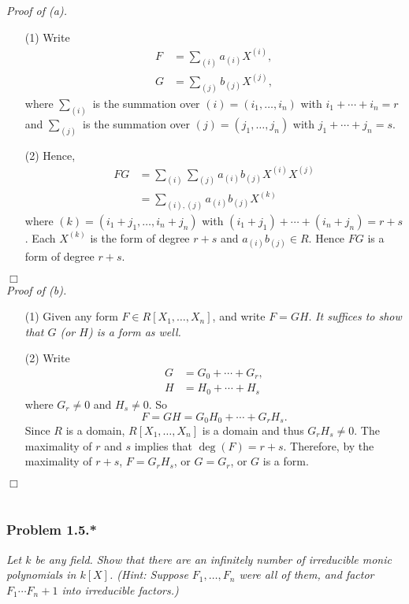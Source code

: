 \documentclass{article}
\begin{document}
\emph{Proof of (a).}
\begin{enumerate}
\item[(1)]
  Write
  \begin{align*}
    F &= \sum_{(i)} a_{(i)} X^{(i)}, \\
    G &= \sum_{(j)} b_{(j)} X^{(j)},
  \end{align*}
  where $\sum_{(i)}$ is the summation over $(i) = (i_1,\ldots,i_n)$ with $i_1+\cdots+i_n = r$
  and $\sum_{(j)}$ is the summation over $(j) = (j_1,\ldots,j_n)$ with $j_1+\cdots+j_n = s$.

\item[(2)]
  Hence,
  \begin{align*}
    FG
    &= \sum_{(i)} \sum_{(j)} a_{(i)}b_{(j)} X^{(i)}X^{(j)} \\
    &= \sum_{(i),(j)} a_{(i)}b_{(j)} X^{(k)}
  \end{align*}
  where $(k) = (i_1+j_1,\ldots,i_n+j_n)$ with $(i_1+j_1)+\cdots+(i_n+j_n) = r+s$.
  Each $X^{(k)}$ is the form of degree $r+s$ and $a_{(i)}b_{(j)} \in R$.
  Hence $FG$ is a form of degree $r+s$.
\end{enumerate}
$\Box$\\



\emph{Proof of (b).}
\begin{enumerate}
\item[(1)]
  Given any form $F \in R[X_1,\ldots,X_n]$, and write $F = GH$.
  \emph{It suffices to show that $G$ (or $H$) is a form as well.}

\item[(2)]
  Write
  \begin{align*}
    G &= G_0+\cdots+G_r, \\
    H &= H_0+\cdots+H_s
  \end{align*}
  where $G_r \neq 0$ and $H_s \neq 0$.
  So
  \[
    F = GH = G_0H_0 + \cdots + G_r H_s.
  \]
  Since $R$ is a domain, $R[X_1,\ldots,X_n]$ is a domain and thus $G_r H_s \neq 0$.
  The maximality of $r$ and $s$ implies that $\deg(F) = r+s$.
  Therefore, by the maximality of $r+s$,
  $F = G_r H_s$, or $G = G_r$, or $G$ is a form.
\end{enumerate}
$\Box$\\\\






\subsubsection*{Problem 1.5.*}
\emph{Let $k$ be any field.
Show that there are an infinitely number of irreducible monic polynomials in $k[X]$.
(Hint: Suppose $F_1,\ldots,F_n$ were all of them, and factor $F_1\cdots F_n+1$ into irreducible factors.)} \\
\end{document}
